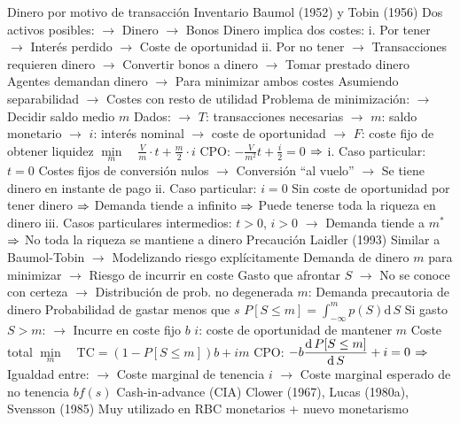 \documentclass{nuevotema}
\begin{document}
\begin{esquemal}
		\2[II] Dinero por motivo de transacción
			\3 Inventario
				\4[] Baumol (1952) y Tobin (1956)
				\4[] Dos activos posibles:
				\4[] $\to$ Dinero
				\4[] $\to$ Bonos
				\4[] Dinero implica dos costes:
				\4[] i. Por tener
				\4[] $\to$ Interés perdido
				\4[] $\to$ Coste de oportunidad
				\4[] ii. Por no tener
				\4[] $\to$ Transacciones requieren dinero
				\4[] $\to$ Convertir bonos a dinero
				\4[] $\to$ Tomar prestado dinero
				\4[] Agentes demandan dinero
				\4[] $\to$ Para minimizar ambos costes
				\4[] Asumiendo separabilidad
				\4[] $\to$ Costes con resto de utilidad
				\4[] Problema de minimización:
				\4[] $\to$ Decidir saldo medio $m$
				\4[] Dados:
				\4[] $\to$ $T$: transacciones necesarias
				\4[] $\to$ $m$: saldo monetario
				\4[] $\to$ $i$: interés nominal $\to$ coste de oportunidad
				\4[] $\to$ $F$: coste fijo de obtener liquidez
				\4[] $\underset{m}{\min}\quad \frac{V}{m} \cdot t + \frac{m}{2} \cdot i$
				\4[] CPO: $- \frac{V}{m^2} t + \frac{i}{2} = 0$
				\4[] $\Rightarrow$ 
				\4[] i. Caso particular: $t=0$
				\4[] Costes fijos de conversión nulos
				\4[] $\to$ Conversión ``al vuelo''
				\4[] $\to$ Se tiene dinero en instante de pago
				\4[] ii. Caso particular: $i=0$
				\4[] Sin coste de oportunidad por tener dinero
				\4[] $\Rightarrow$ Demanda tiende a infinito
				\4[] $\Rightarrow$ Puede tenerse toda la riqueza en dinero
				\4[] iii. Casos particulares intermedios: $t>0$, $i>0$
				\4[] $\to$ Demanda tiende a $m^*$
				\4[] $\Rightarrow$ No toda la riqueza se mantiene a dinero
			\3 Precaución
				\4[] Laidler (1993)
				\4[] Similar a Baumol-Tobin
				\4[] $\to$ Modelizando riesgo explícitamente
				\4[] Demanda de dinero $m$ para minimizar
				\4[] $\to$ Riesgo de incurrir en coste
				\4[] Gasto que afrontar $S$
				\4[] $\to$ No se conoce con certeza
				\4[] $\to$ Distribución de prob. no degenerada
				\4[] $m$: Demanda precautoria de dinero
				\4[] Probabilidad de gastar menos que $s$
				\4[] $P \left[ S \leq m \right] = \int_{-\infty}^{m} p(S) \text{d} \, S$
				\4[] Si gasto $S > m$:
				\4[] $\to$ Incurre en coste fijo $b$
				\4[] $i$: coste de oportunidad de mantener $m$
				\4[] Coste total
				\4[] $\underset{m}{\min}\quad \text{TC} = (1-P[S \leq m])b + im$
				\4[] CPO: $-b \dfrac{\text{d} \, P[ S \leq m]}{\text{d} \, S} + i = 0$
				\4[] $\Rightarrow$ 
				\4[] Igualdad entre:
				\4[] $\to$ Coste marginal de tenencia $i$
				\4[] $\to$ Coste marginal esperado de no tenencia $bf(s)$
			\3 Cash-in-advance (CIA)
				\4[] Clower (1967), Lucas (1980a), Svensson (1985)
				\4[] Muy utilizado en RBC monetarios + nuevo monetarismo

\end{esquemal}
\end{document}
